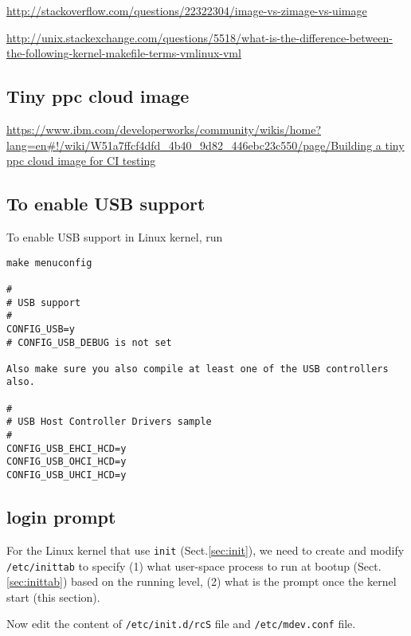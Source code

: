 \url{http://stackoverflow.com/questions/22322304/image-vs-zimage-vs-uimage}

\url{http://unix.stackexchange.com/questions/5518/what-is-the-difference-between-the-following-kernel-makefile-terms-vmlinux-vml}


\subsection{Tiny ppc cloud image}

\url{https://www.ibm.com/developerworks/community/wikis/home?lang=en#!/wiki/W51a7ffcf4dfd_4b40_9d82_446ebc23c550/page/Building a tiny ppc cloud image for CI testing}

\subsection{To enable USB support}

To enable USB support in Linux kernel, run
\begin{verbatim}
make menuconfig

#
# USB support
#
CONFIG_USB=y
# CONFIG_USB_DEBUG is not set

Also make sure you also compile at least one of the USB controllers also.

#
# USB Host Controller Drivers sample
#
CONFIG_USB_EHCI_HCD=y
CONFIG_USB_OHCI_HCD=y
CONFIG_USB_UHCI_HCD=y
\end{verbatim}

\subsection{login prompt}
\label{sec:login-prompt}

For the Linux kernel that use \verb!init! (Sect.\ref{sec:init}), we
need to create and modify \verb!/etc/inittab! to specify
(1) what user-space process to run at bootup (Sect.\ref{sec:inittab}) based on
the running level, (2) what is the prompt once the kernel start (this section).



Now edit the content of \verb!/etc/init.d/rcS! file and \verb!/etc/mdev.conf!
file.

